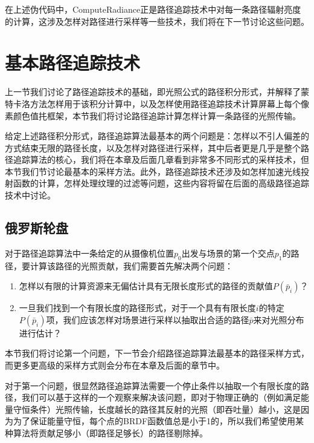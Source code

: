 在上述伪代码中，ComputeRadiance正是路径追踪技术中对每一条路径辐射亮度的计算，这涉及怎样对路径进行采样等一些技术，我们将在下一节讨论这些问题。





\section{基本路径追踪技术}\label{sec:pt-basic}
上一节我们讨论了路径追踪技术的基础，即光照公式的路径积分形式，并解释了蒙特卡洛方法怎样用于该积分计算中，以及怎样使用路径追踪技术计算屏幕上每个像素颜色值扥框架，本节我们将讨论路径追踪计算怎样计算一条路径的光照传输。

给定上述路径积分形式，路径追踪算法最基本的两个问题是：怎样以不引人偏差的方式结束无限的路径长度，以及怎样对路径进行采样，其中后者更是几乎是整个路径追踪算法的核心，我们将在本章及后面几章看到非常多不同形式的采样技术，但本节我们节讨论最基本的采样方法。此外，路径追踪技术还涉及如怎样加速光线投射函数的计算，怎样处理纹理的过滤等问题，这些内容将留在后面的高级路径追踪技术中讨论。






\subsection{俄罗斯轮盘}\label{sec:russian-roulette}
对于路径追踪算法中一条给定的从摄像机位置$p_0$出发与场景的第一个交点$p_1$的路径，要计算该路径的光照贡献，我们需要首先解决两个问题：

\begin{enumerate}
	\item 怎样以有限的计算资源来无偏估计具有无限长度形式的路径的贡献值$P(\bar{p}_i)$？
	\item 一旦我们找到一个有限长度的路径形式，对于一个具有有限长度$i$的特定$P(\bar{p}_i)$项，我们应该怎样对场景进行采样以抽取出合适的路径$\bar{p}$来对光照分布进行估计？
\end{enumerate}

本节我们将讨论第一个问题，下一节会介绍路径追踪算法最基本的路径采样方式，而更多更高级的采样方式则会分布在本章及后面的章节中。

对于第一个问题，很显然路径追踪算法需要一个停止条件以抽取一个有限长度的路径，我们可以基于这样的一个观察来解决该问题，即对于物理正确的（例如满足能量守恒条件）光照传输，长度越长的路径其反射的光照（即吞吐量）越小，这是因为为了保证能量守恒，每个点的BRDF函数值总是小于1的，所以我们希望使用某种算法将贡献足够小（即路径足够长）的路径剔除掉。

